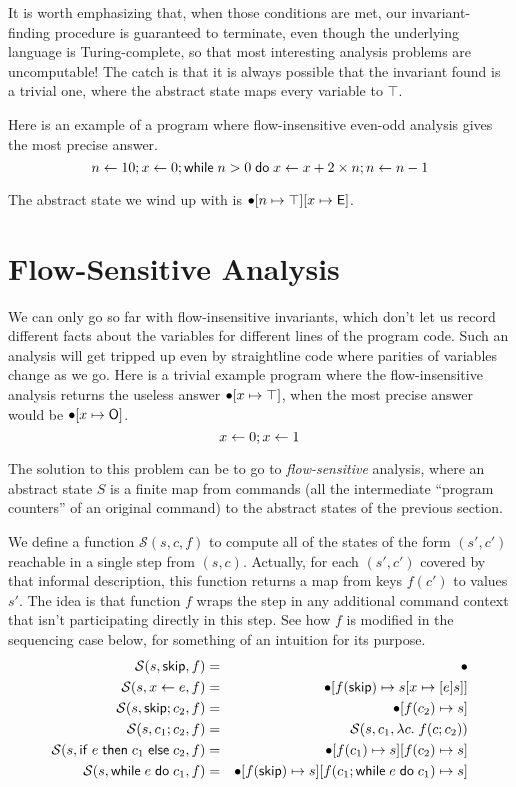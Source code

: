 \documentclass{amsbook}
\theoremstyle{definition}
\theoremstyle{remark}
\numberwithin{section}{chapter}
\numberwithin{equation}{chapter}
\begin{document}
It is worth emphasizing that, when those conditions are met, our invariant-finding procedure is guaranteed to terminate, even though the underlying language is Turing-complete, so that most interesting analysis problems are uncomputable!
The catch is that it is always possible that the invariant found is a trivial one, where the abstract state maps every variable to $\top$.

Here is an example of a program where flow-insensitive even-odd analysis gives the most precise answer.
$$n \leftarrow 10; x \leftarrow 0; \mathsf{while} \; n > 0 \; \mathsf{do} \; x \leftarrow x + 2 \times n; n \leftarrow n - 1$$

The abstract state we wind up with is $\bullet[n \mapsto \top][x \mapsto \mathsf{E}]$.

\section{Flow-Sensitive Analysis}

We can only go so far with flow-insensitive invariants, which don't let us record different facts about the variables for different lines of the program code.
Such an analysis will get tripped up even by straightline code where parities of variables change as we go.
Here is a trivial example program where the flow-insensitive analysis returns the useless answer $\bullet[x \mapsto \top]$, when the most precise answer would be $\bullet[x \mapsto \mathsf{O}]$.
$$x \leftarrow 0; x \leftarrow 1$$

The solution to this problem can be to go to \emph{flow-sensitive} analysis, where an abstract state $S$ is a finite map from commands (all the intermediate ``program counters'' of an original command) to the abstract states of the previous section.

\newcommand{\absstep}[3]{\mathcal S(#1, #2, #3)}
\newcommand{\absstepo}[2]{\mathcal S(#1, #2)}

We define a function $\absstep{s}{c}{f}$ to compute all of the states of the form $(s', c')$ reachable in a single step from $(s, c)$.
Actually, for each $(s', c')$ covered by that informal description, this function returns a map from keys $f(c')$ to values $s'$.
The idea is that function $f$ wraps the step in any additional command context that isn't participating directly in this step.
See how $f$ is modified in the sequencing case below, for something of an intuition for its purpose.
\begin{eqnarray*}
  \absstep{s}{\skipe}{f} &=& \mempty \\
  \absstep{s}{\assign{x}{e}}{f} &=& \mupd{\mempty}{f(\skipe)}{\mupd{s}{x}{\absexp{e}s}} \\
  \absstep{s}{\skipe; c_2}{f} &=& \mupd{\mempty}{f(c_2)}{s} \\
  \absstep{s}{c_1; c_2}{f} &=& \absstep{s}{c_1}{\lambda c. \; f(c; c_2)} \\
  \absstep{s}{\ifte{e}{c_1}{c_2}}{f} &=& \mupd{\mupd{\mempty}{f(c_1)}{s}}{f(c_2)}{s} \\
  \absstep{s}{\while{e}{c_1}}{f} &=& \mupd{\mupd{\mempty}{f(\skipe)}{s}}{f(c_1; \while{e}{c_1})}{s}
\end{eqnarray*}
\end{document}
